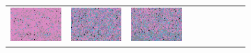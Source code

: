 \documentclass{ipol}
\begin{document}
\begin{figure}[ht]
\begin{subfigure}[t]{\linewidth}
\begin{tabular}{ccccccccc}
                \includegraphics[width=\s]{images/flowers/LINEAR/iso_n5_64_grids.png}&
                \includegraphics[width=\s]{images/flowers/PPG/iso_n5_64_grids.png}&
                \includegraphics[width=\s]{images/flowers/VNG/iso_n5_64_grids.png}\\

\end{tabular}
\end{subfigure}
\end{figure}
\end{document}
